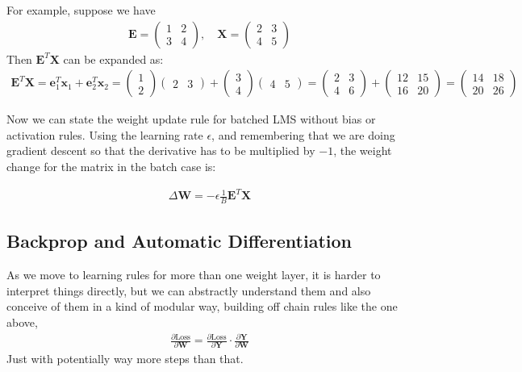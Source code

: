 For example, suppose we have
\begin{eqnarray*}
\mathbf{E} = \begin{pmatrix} 1 & 2 \\ 3 & 4 \end{pmatrix}, \quad \mathbf{X} = \begin{pmatrix} 2 & 3 \\ 4 & 5 \end{pmatrix}
\end{eqnarray*}
Then $\mathbf{E}^T \mathbf{X}$ can be expanded as:
\begin{eqnarray*}
\mathbf{E}^T \mathbf{X} = \mathbf{e}_1^T \mathbf{x}_1 + \mathbf{e}_2^T \mathbf{x}_2 = \begin{pmatrix} 1 \\ 2 \end{pmatrix} \begin{pmatrix} 2 & 3 \end{pmatrix} + \begin{pmatrix} 3 \\ 4 \end{pmatrix} \begin{pmatrix} 4 & 5 \end{pmatrix} = \begin{pmatrix} 2 & 3 \\ 4 & 6 \end{pmatrix} + \begin{pmatrix} 12 & 15 \\ 16 & 20 \end{pmatrix} = \begin{pmatrix} 14 & 18 \\ 20 & 26 \end{pmatrix}
\end{eqnarray*}

Now we can state the weight update rule for batched LMS without bias or activation rules. Using the learning rate $\epsilon$, and remembering that we are doing gradient descent so that the derivative has to be multiplied by $-1$, the weight change for the matrix in the batch case is:

\begin{eqnarray}
\Delta \mathbf{W} =  - \epsilon \frac{1}{B} \mathbf{E}^T \mathbf{X}
\end{eqnarray}
   
\subsection{Backprop and Automatic Differentiation}

As we move to learning rules for more than one weight layer, it is harder to interpret things directly, but we can abstractly understand them and also conceive of them in a kind of modular way, building off chain rules like the one above, 
\begin{eqnarray}
\frac{\partial \text{Loss}}{\partial \mathbf{W}} = \frac{\partial \text{Loss}}{\partial \mathbf{Y}} \cdot \frac{\partial \mathbf{Y}}{\partial \mathbf{W}}
\end{eqnarray}
Just with potentially way more steps than that.
